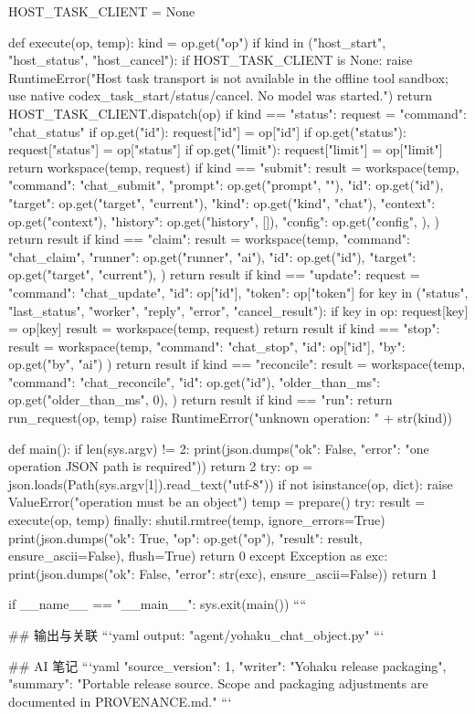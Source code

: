 HOST_TASK_CLIENT = None


def execute(op, temp):
    kind = op.get("op")
    if kind in ("host_start", "host_status", "host_cancel"):
        if HOST_TASK_CLIENT is None:
            raise RuntimeError("Host task transport is not available in the offline tool sandbox; use native codex_task_start/status/cancel. No model was started.")
        return HOST_TASK_CLIENT.dispatch(op)
    if kind == "status":
        request = {"command": "chat_status"}
        if op.get("id"):
            request["id"] = op["id"]
        if op.get("status"):
            request["status"] = op["status"]
        if op.get("limit"):
            request["limit"] = op["limit"]
        return workspace(temp, request)
    if kind == "submit":
        result = workspace(temp, {
            "command": "chat_submit",
            "prompt": op.get("prompt", ""),
            "id": op.get("id"),
            "target": op.get("target", "current"),
            "kind": op.get("kind", "chat"),
            "context": op.get("context"),
            "history": op.get("history", []),
            "config": op.get("config", {}),
        })
        return result
    if kind == "claim":
        result = workspace(temp, {
            "command": "chat_claim",
            "runner": op.get("runner", "ai"),
            "id": op.get("id"),
            "target": op.get("target", "current"),
        })
        return result
    if kind == "update":
        request = {"command": "chat_update", "id": op["id"], "token": op["token"]}
        for key in ("status", "last_status", "worker", "reply", "error", "cancel_result"):
            if key in op:
                request[key] = op[key]
        result = workspace(temp, request)
        return result
    if kind == "stop":
        result = workspace(temp, {
            "command": "chat_stop", "id": op["id"], "by": op.get("by", "ai")
        })
        return result
    if kind == "reconcile":
        result = workspace(temp, {
            "command": "chat_reconcile",
            "id": op.get("id"),
            "older_than_ms": op.get("older_than_ms", 0),
        })
        return result
    if kind == "run":
        return run_request(op, temp)
    raise RuntimeError("unknown operation: " + str(kind))


def main():
    if len(sys.argv) != 2:
        print(json.dumps({"ok": False, "error": "one operation JSON path is required"}))
        return 2
    try:
        op = json.loads(Path(sys.argv[1]).read_text("utf-8"))
        if not isinstance(op, dict):
            raise ValueError("operation must be an object")
        temp = prepare()
        try:
            result = execute(op, temp)
        finally:
            shutil.rmtree(temp, ignore_errors=True)
        print(json.dumps({"ok": True, "op": op.get("op"), "result": result},
                         ensure_ascii=False), flush=True)
        return 0
    except Exception as exc:
        print(json.dumps({"ok": False, "error": str(exc)}, ensure_ascii=False))
        return 1


if __name__ == "__main__":
    sys.exit(main())
````

## 输出与关联
```yaml
output: "agent/yohaku_chat_object.py"
```

## AI 笔记
```yaml
{"source_version": 1, "writer": "Yohaku release packaging", "summary": "Portable release source. Scope and packaging adjustments are documented in PROVENANCE.md."}
```

